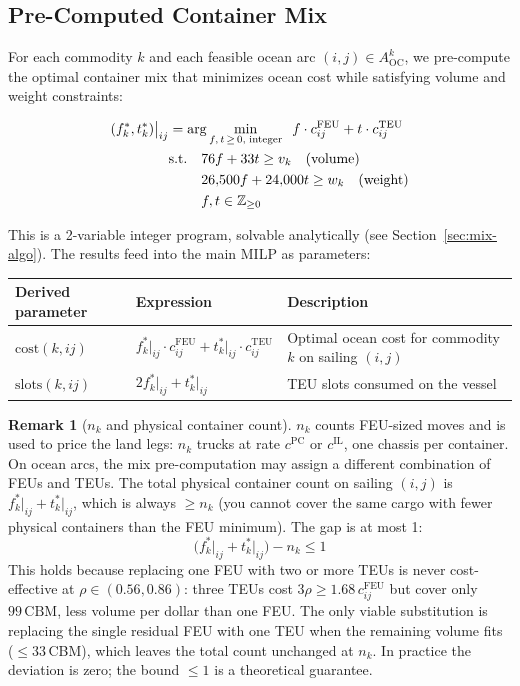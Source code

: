 \documentclass[11pt,a4paper]{article}
\theoremstyle{definition}
\newtheorem{remark}{Remark}
\begin{document}
\subsection{Pre-Computed Container Mix}
\label{sec:containermix}

For each commodity $k$ and each feasible ocean arc $(i,j) \in A^k_{\text{OC}}$, we pre-compute
the optimal container mix that minimizes ocean cost while satisfying volume and weight constraints:

\begin{align}
  (f_k^*, t_k^*)\big|_{ij} &= \arg\min_{f,\,t \,\geq\, 0,\; \text{integer}} \;\;
    f \cdot c_{ij}^{\text{FEU}} + t \cdot c_{ij}^{\text{TEU}} \notag \\
  &\text{s.t.}\quad 76f + 33t \geq v_k \quad \text{(volume)} \label{eq:mix-vol} \\
  &\phantom{\text{s.t.}}\quad 26{,}500f + 24{,}000t \geq w_k \quad \text{(weight)} \label{eq:mix-wt} \\
  &\phantom{\text{s.t.}}\quad f, t \in \mathbb{Z}_{\geq 0} \notag
\end{align}

This is a 2-variable integer program, solvable analytically (see Section~\ref{sec:mix-algo}).
The results feed into the main MILP as parameters:

\begin{center}
\begin{tabular}{lll}
\toprule
Derived parameter & Expression & Description \\
\midrule
$\text{cost}(k,ij)$ & $f_k^*\big|_{ij} \cdot c_{ij}^{\text{FEU}} + t_k^*\big|_{ij} \cdot c_{ij}^{\text{TEU}}$ & Optimal ocean cost for commodity $k$ on sailing $(i,j)$ \\
$\text{slots}(k,ij)$ & $2 f_k^*\big|_{ij} + t_k^*\big|_{ij}$ & TEU slots consumed on the vessel \\
\bottomrule
\end{tabular}
\end{center}

\begin{remark}[$n_k$ and physical container count]
$n_k$ counts FEU-sized moves and is used to price the land legs: $n_k$ trucks at rate
$c^{\text{PC}}$ or $c^{\text{IL}}$, one chassis per container. On ocean arcs, the mix
pre-computation may assign a different combination of FEUs and TEUs. The total physical
container count on sailing $(i,j)$ is $f_k^*\big|_{ij} + t_k^*\big|_{ij}$, which is always
$\geq n_k$ (you cannot cover the same cargo with fewer physical containers than the FEU
minimum). The gap is at most 1:
\[
  \bigl(f_k^*\big|_{ij} + t_k^*\big|_{ij}\bigr) - n_k \leq 1
\]
This holds because replacing one FEU with two or more TEUs is never cost-effective at
$\rho \in (0.56, 0.86)$: three TEUs cost $3\rho \geq 1.68\,c_{ij}^{\text{FEU}}$ but cover
only $99\,\text{CBM}$, less volume per dollar than one FEU. The only viable substitution is
replacing the single residual FEU with one TEU when the remaining volume fits ($\leq 33$\,CBM),
which leaves the total count unchanged at $n_k$. In practice the deviation is zero; the bound
$\leq 1$ is a theoretical guarantee.
\end{remark}
\end{document}

